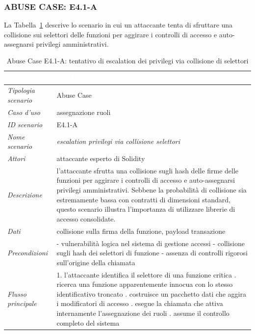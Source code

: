 \subsubsection*{ABUSE CASE: E4.1-A}
La Tabella~\ref{tab:e41a} descrive lo scenario in cui un attaccante tenta di sfruttare una collisione sui selettori delle funzioni per aggirare i controlli di accesso e auto-assegnarsi privilegi amministrativi.
\begin{longtable}{| >{\columncolor{abuseCol}}p{} | p{} |}
\caption{Abuse Case E4.1-A: tentativo di escalation dei privilegi via collisione di selettori}\label{tab:e41a}\\
\hline
\rowcolor{abuseHeader} \textcolor{white}{\textit{Campo}} & \textcolor{white}{\textit{Contenuto}} \\
\hline
\textit{Tipologia scenario} & Abuse Case \\
\hline
\textit{Caso d'uso} & assegnazione ruoli \\
\hline
\textit{ID scenario} & E4.1-A \\
\hline
\textit{Nome scenario} & \textit{escalation privilegi via collisione selettori} \\
\hline
\textit{Attori} & attaccante esperto di Solidity \\
\hline
\textit{Descrizione} & l'attaccante sfrutta una collisione sugli hash delle firme delle funzioni per aggirare i controlli di accesso e auto-assegnarsi privilegi amministrativi. Sebbene la probabilità di collisione sia estremamente bassa con contratti di dimensioni standard, questo scenario illustra l'importanza di utilizzare librerie di accesso consolidate. \\
\hline
\textit{Dati} & collisione sulla firma della funzione, payload transazione \\
\hline
\textit{Precondizioni} & - vulnerabilità logica nel sistema di gestione accessi \newline - collisione sugli hash dei selettori di funzione \newline - assenza di controlli rigorosi sull'origine della chiamata \\
\hline
\textit{Flusso principale} & 1. l'attaccante identifica il selettore di una funzione critica \newline 2. ricerca una funzione apparentemente innocua con lo stesso identificativo troncato \newline 3. costruisce un pacchetto dati che aggira i modificatori di accesso \newline 4. esegue la chiamata che attiva internamente l'assegnazione dei ruoli \newline 5. assume il controllo completo del sistema \\

\end{longtable}
